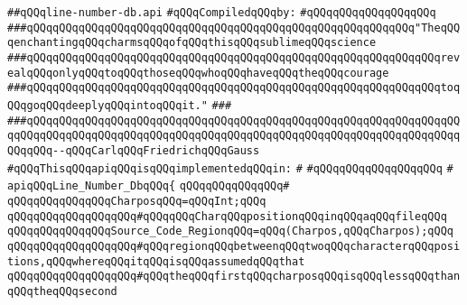 \label{src/lib/c-kit/src/parser/stuff/line-number-db.api}
\verb|##qQQqline-number-db.api|\newline
\newline
\verb|#qQQqCompiledqQQqby:|\newline
\verb|#qQQqqQQqqQQqqQQqqQQq|\newline
\newline
\verb|###qQQqqQQqqQQqqQQqqQQqqQQqqQQqqQQqqQQqqQQqqQQqqQQqqQQqqQQqqQQq"TheqQQqenchantingqQQqcharmsqQQqofqQQqthisqQQqsublimeqQQqscience|\newline
\verb|###qQQqqQQqqQQqqQQqqQQqqQQqqQQqqQQqqQQqqQQqqQQqqQQqqQQqqQQqqQQqqQQqrevealqQQqonlyqQQqtoqQQqthoseqQQqwhoqQQqhaveqQQqtheqQQqcourage|\newline
\verb|###qQQqqQQqqQQqqQQqqQQqqQQqqQQqqQQqqQQqqQQqqQQqqQQqqQQqqQQqqQQqqQQqtoqQQqgoqQQqdeeplyqQQqintoqQQqit."|\newline
\verb|###|\newline
\verb|###qQQqqQQqqQQqqQQqqQQqqQQqqQQqqQQqqQQqqQQqqQQqqQQqqQQqqQQqqQQqqQQqqQQqqQQqqQQqqQQqqQQqqQQqqQQqqQQqqQQqqQQqqQQqqQQqqQQqqQQqqQQqqQQqqQQqqQQqqQQqqQQq--qQQqCarlqQQqFriedrichqQQqGauss|\newline
\newline
\newline
\newline
\verb|#qQQqThisqQQqapiqQQqisqQQqimplementedqQQqin:|\newline
\verb|#|\newline
\verb|#qQQqqQQqqQQqqQQqqQQq|\newline
\verb|#|\newline
\verb|apiqQQqLine_Number_DbqQQq{|\newline
\verb|qQQqqQQqqQQqqQQq#|\newline
\verb|qQQqqQQqqQQqqQQqCharposqQQq=qQQqInt;qQQq|\newline
\verb|qQQqqQQqqQQqqQQqqQQq#qQQqqQQqCharqQQqpositionqQQqinqQQqaqQQqfileqQQq|\newline
\newline
\verb|qQQqqQQqqQQqqQQqSource_Code_RegionqQQq=qQQq(Charpos,qQQqCharpos);qQQq|\newline
\verb|qQQqqQQqqQQqqQQqqQQq#qQQqregionqQQqbetweenqQQqtwoqQQqcharacterqQQqpositions,qQQqwhereqQQqitqQQqisqQQqassumedqQQqthat|\newline
\verb|qQQqqQQqqQQqqQQqqQQq#qQQqtheqQQqfirstqQQqcharposqQQqisqQQqlessqQQqthanqQQqtheqQQqsecond|\newline

